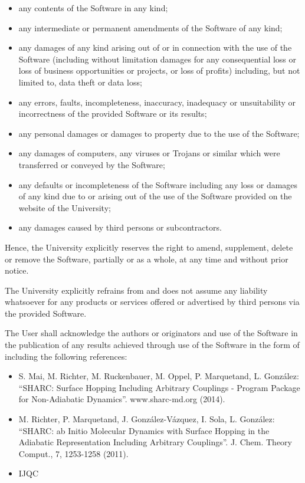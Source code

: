 \documentclass[a4paper,10pt,DIV=15,openany,twoside=false]{scrbook}
\newcommand{\todo}[1]{\textcolor{RL}{#1}}
\begin{document}
{\begin{shaded}
\begin{itemize}
  \item any contents of the Software in any kind;
  \item any intermediate or permanent amendments of the Software of any kind;
  \item any damages of any kind arising out of or in connection with the use of the Software (including without limitation damages for any consequential loss or loss of business opportunities or projects, or loss of profits) including, but not limited to, data theft or data loss;
  \item any errors, faults, incompleteness, inaccuracy, inadequacy or unsuitability or incorrectness of the provided Software or its results;
  \item any personal damages or damages to property due to the use of the Software;
  \item any damages of computers, any viruses or Trojans or similar which were transferred or conveyed by the Software;
  \item any defaults or incompleteness of the Software including any loss or damages of any kind due to or arising out of the use of the Software provided on the website of the University;
  \item any damages caused by third persons or subcontractors.
\end{itemize}

Hence, the University explicitly reserves the right to amend, supplement, delete or remove the Software, partially or as a whole, at any time and without prior notice.

The University explicitly refrains from and does not assume any liability whatsoever for any products or services offered or advertised by third persons via the provided Software.


The User shall acknowledge the authors or originators and use of the Software in the publication of any results achieved through use of the Software in the form of including the following references:

\begin{itemize}
  \item \todo{S. Mai, M. Richter, M. Ruckenbauer, M. Oppel, P. Marquetand, L. Gonz\'alez}: ``SHARC: Surface Hopping Including Arbitrary Couplings - Program Package for Non-Adiabatic Dynamics''. www.sharc-md.org (2014).
  \item M. Richter, P. Marquetand, J. Gonz\'alez-V\'azquez, I. Sola, L. Gonz\'alez: ``SHARC: ab Initio Molecular Dynamics with Surface Hopping in the Adiabatic Representation Including Arbitrary Couplings''. J. Chem. Theory Comput., 7, 1253-1258 (2011).
  \item \todo{IJQC}
\end{itemize}


\end{shaded}}
\end{document}
